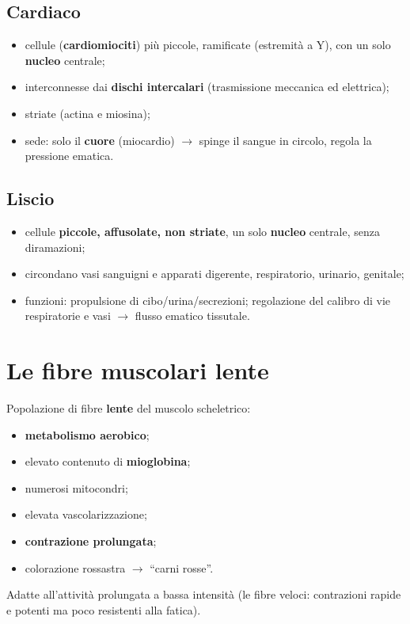 \subsection{Cardiaco}
\begin{itemize}
  \item cellule (\textbf{cardiomiociti}) più piccole, ramificate (estremità a Y), con un solo
    \textbf{nucleo} centrale;
  \item interconnesse dai \textbf{dischi intercalari} (trasmissione meccanica ed elettrica);
  \item striate (actina e miosina);
  \item sede: solo il \textbf{cuore} (miocardio) $\rightarrow$ spinge il sangue in circolo, regola
    la pressione ematica.
\end{itemize}

\subsection{Liscio}
\begin{itemize}
  \item cellule \textbf{piccole, affusolate, non striate}, un solo \textbf{nucleo} centrale, senza
    diramazioni;
  \item circondano vasi sanguigni e apparati digerente, respiratorio, urinario, genitale;
  \item funzioni: propulsione di cibo/urina/secrezioni; regolazione del calibro di vie respiratorie
    e vasi $\rightarrow$ flusso ematico tissutale.
\end{itemize}

\section{Le fibre muscolari lente}

Popolazione di fibre \textbf{lente} del muscolo scheletrico:
\begin{itemize}
  \item \textbf{metabolismo aerobico};
  \item elevato contenuto di \textbf{mioglobina};
  \item numerosi mitocondri;
  \item elevata vascolarizzazione;
  \item \textbf{contrazione prolungata};
  \item colorazione rossastra $\rightarrow$ ``carni rosse''.
\end{itemize}
Adatte all'attività prolungata a bassa intensità (le fibre veloci: contrazioni rapide e potenti ma
poco resistenti alla fatica).

